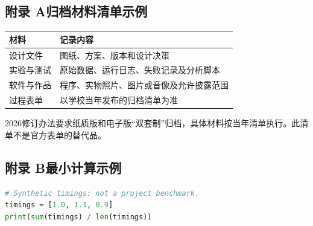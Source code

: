 \subsection*{附录 A\quad 归档材料清单示例}
\begin{longtable}{lp{.65\linewidth}}\toprule 材料 & 记录内容\\\midrule\endhead
设计文件 & 图纸、方案、版本和设计决策\\
实验与测试 & 原始数据、运行日志、失败记录及分析脚本\\
软件与作品 & 程序、实物照片、图片或音像及允许披露范围\\
过程表单 & 以学校当年发布的归档清单为准\\\bottomrule\end{longtable}
2026修订办法要求纸质版和电子版“双套制”归档，具体材料按当年清单执行。此清单不是官方表单的替代品。
\subsection*{附录 B\quad 最小计算示例}
\begin{lstlisting}[language=Python]
# Synthetic timings: not a project benchmark.
timings = [1.0, 1.1, 0.9]
print(sum(timings) / len(timings))
\end{lstlisting}

